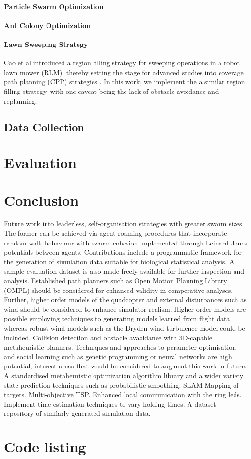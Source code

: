 \documentclass{report}
\begin{document}
\subsubsection{Particle Swarm Optimization}
\subsubsection{Ant Colony Optimization}
\subsubsection{Lawn Sweeping Strategy}
Cao et al \cite{Cao1988} introduced a region filling strategy for sweeping operations in a robot lawn mower (RLM), thereby setting the stage for advanced studies into coverage path planning (CPP) strategies \cite{Galceran2013}. In this work, we implement the a similar region filling strategy, with one caveat being the lack of obstacle avoidance and replanning.

\section{Data Collection}

\chapter{Evaluation} \label{evaluation}

\chapter{Conclusion} \label{conclusion}
Future work into leaderless, self-organisation strategies with greater swarm sizes. The former can be achieved via agent roaming procedures that incorporate random walk behaviour with swarm cohesion implemented through Leinard-Jones potentials between agents.
Contributions include a programmatic framework for the generation of simulation data suitable for biological statistical analysis. A sample evaluation dataset is also made freely available for further inspection and analysis. Established path planners such as Open Motion Planning Library (OMPL) \cite{Sucan2012} should be considered for enhanced validity in comperative analyses. Further, higher order models of the quadcopter and external disturbances such as wind should be considered to enhance simulator realism. Higher order models are possible employing techniques to generating models learned from flight data \cite{Symington2014} whereas robust wind models such as the Dryden wind turbulence model \cite{Dryden} could be included. Collision detection and obstacle avaoidance with 3D-capable metaheuristic planners. Techniques and approaches to parameter optimisation and social learning such as genetic programming or neural networks are high potential, interest areas that would be considered to augment this work in future.
A standardised metaheuristic optimization algorithm library and a wider variety state prediction techniques such as probabilistic smoothing.
SLAM Mapping of targets.
Multi-objective TSP.
Enhanced local communication with the ring leds.
Implement time estimation techniques to vary holding times.
A dataset repository of similarly generated simulation data.

\appendix


\chapter{Code listing}
\end{document}

